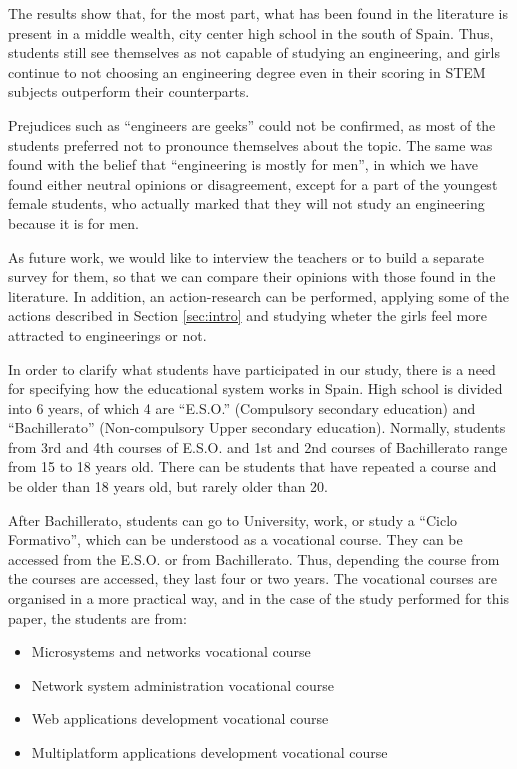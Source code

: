 \documentclass[journal,transmag]{IEEEtran}
\begin{document}
The results show that, for the most part, what has been found in the literature is present in a middle wealth, city center high school in the south of Spain. Thus, students still see themselves as not capable of studying an engineering, and girls continue to not choosing an engineering degree even in their scoring in STEM subjects outperform their counterparts.

Prejudices such as ``engineers are geeks'' could not be confirmed, as most of the students preferred not to pronounce themselves about the topic. The same was found with the belief that ``engineering is mostly for men'', in which we have found either neutral opinions or disagreement, except for a part of the youngest female students, who actually marked that they will not study an engineering because it is for men.

As future work, we would like to interview the teachers or to build a separate survey for them, so that we can compare their opinions with those found in the literature. In addition, an action-research can be performed, applying some of the actions described in Section \ref{sec:intro} and studying wheter the girls feel more attracted to engineerings or not.

\label{ap:courses}

In order to clarify what students have participated in our study, there is a need for specifying how the educational system works in Spain. High school is divided into 6 years, of which 4 are ``E.S.O.'' (Compulsory secondary education) and ``Bachillerato'' (Non-compulsory Upper secondary education). Normally, students from 3rd and 4th courses of E.S.O. and 1st and 2nd courses of Bachillerato range from 15 to 18 years old. There can be students that have repeated a course and be older than 18 years old, but rarely older than 20.

After Bachillerato, students can go to University, work, or study a ``Ciclo Formativo'', which can be understood as a vocational course. They can be accessed from the E.S.O. or from Bachillerato. Thus, depending the course from the courses are accessed, they last four or two years. The vocational courses are organised in a more practical way, and in the case of the study performed for this paper, the students are from:

\begin{itemize}
  \item Microsystems and networks vocational course
  \item Network system administration vocational course
  \item Web applications development vocational course
  \item Multiplatform applications development vocational course
\end{itemize}
\end{document}
